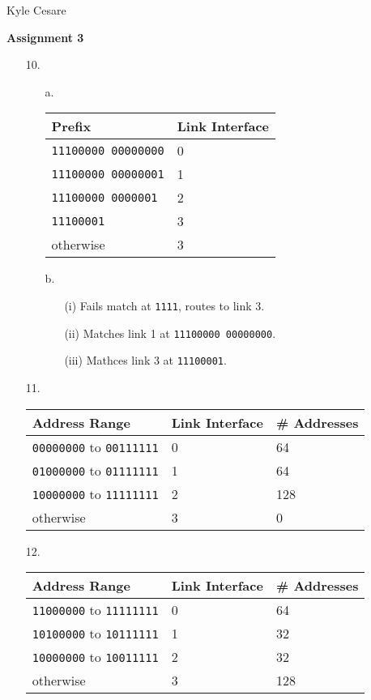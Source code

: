 \documentclass[11pt]{article}
\begin{document}
\begin{flushright}
  Kyle Cesare
\end{flushright}

{\center \textbf{Assignment 3} \\}

\begin{itemize}
  \item[10.]
    \begin{itemize}
      \item[a.]
        \begin{tabular}{l l}
          \hline
          Prefix & Link Interface \\ \hline
          \texttt{11100000 00000000} & 0 \\
          \texttt{11100000 00000001} & 1 \\
          \texttt{11100000 0000001} & 2 \\
          \texttt{11100001} & 3 \\
          otherwise & 3 \\
          \hline
        \end{tabular}
      \item[b.]
        \begin{itemize}
          \item[(i)] Fails match at \texttt{1111}, routes to link 3.
          \item[(ii)] Matches link 1 at \texttt{11100000 00000000}.
          \item[(iii)] Mathces link 3 at \texttt{11100001}.
        \end{itemize}
    \end{itemize}

  \item[11.]
    \begin{tabular}{l l l}
      \hline
      Address Range & Link Interface & \# Addresses \\ \hline
      \texttt{00000000} to \texttt{00111111} & 0 & 64 \\
      \texttt{01000000} to \texttt{01111111} & 1 & 64 \\
      \texttt{10000000} to \texttt{11111111} & 2 & 128 \\
      otherwise & 3 & 0 \\
      \hline
    \end{tabular}

  \item[12.]
    \begin{tabular}{l l l}
      \hline
      Address Range & Link Interface & \# Addresses \\ \hline
      \texttt{11000000} to \texttt{11111111} & 0 & 64 \\
      \texttt{10100000} to \texttt{10111111} & 1 & 32 \\
      \texttt{10000000} to \texttt{10011111} & 2 & 32 \\
      otherwise & 3 & 128 \\
      \hline
    \end{tabular}
  

\end{itemize}
\end{document}
